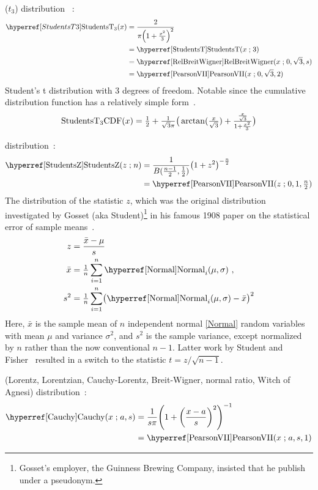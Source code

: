  ($t_3$) distribution~\cite{Devroye1986} :
\begin{align}
\label{StudentsT3}
\StudentsTTT(x)
&= \frac{2}{\pi \Left( 1 + \tfrac{x^2}{3} \Right)^{2} } \checked
\\ \notag 
& = \opr{StudentsT}(x\given 3) \checked
\\ \notag
& = \opr{RelBreitWigner}(x\given 0, \sqrt{3}, s) 
\\ \notag 
&= \opr{PearsonVII}(x\given 0,\sqrt{3},2) \checked
\end{align}
Student's t distribution with 3 degrees of freedom. Notable since the cumulative distribution function has a relatively simple form~\cite[p37]{Devroye1986}.
\[
\notag 
\op{StudentsT_3 CDF} (x) = \half + \sfrac{1}{\sqrt{3}\pi} \bigr( \arctan( \sfrac{x}{\sqrt{3}}) + \sfrac{\sfrac{x}{\sqrt{3}}}{1+\sfrac{x^2}{3}} \bigl) \checked
\]



  distribution~\cite{Student1908,Hanley2008}:
\begin{align}
\label{StudentsZ}
\opr{StudentsZ}(z\given n) &= \frac{1}{B(\tfrac{n-1}{2}, \tfrac{1}{2})}  \Left( 1 + z^2 \Right)^{-\frac{n}{2} } \checked \\
&= \opr{PearsonVII}(z\given 0,1,\tfrac{n}{2}) \notag \checked
\end{align}
The distribution of the statistic $z$, which was the original distribution investigated by Gosset (aka Student)\footnote{Gosset's employer, the Guinness Brewing Company, insisted that he publish under a pseudonym.} in his famous 1908 paper
 on the statistical error of sample means~\cite{Student1908}.
\begin{align*}
	z &= \frac {\bar{x} - \mu}{s} \\ 
	\bar{x} &= \tfrac{1}{n} \sum_{i=1}^{n} \opr{Normal}_i (\mu,\sigma) \ , \\
	s^2 &= \tfrac{1}{n} \sum_{i=1}^{n} \bigl( \opr{Normal}_i (\mu,\sigma) - \bar{x} \bigr)^2
\end{align*}
Here, $\bar{x}$ is the sample mean of $n$ independent normal \eqref{Normal} random variables with mean $\mu$ and variance  $\sigma^2$, and $s^2$ is the sample variance, except normalized by $n$ rather than the now conventional $n-1$. Latter work by Student and Fisher~\cite{Fisher1925b} resulted in a switch to the statistic $t= z/\sqrt{n-1}$.


 (Lorentz, Lorentzian, Cauchy-Lorentz,  Breit-Wigner, normal ratio, Witch of Agnesi) distribution~\cite{Poisson1827,Cauchy1853,Johnson1995}: 
%
\begin{align}
\label{Cauchy}
\opr{Cauchy}(x\given a,s) &= \frac{1}{s \pi} \Left( 1 +\Left( \frac{x-a}{s}\Right)^2 \Right)^{-1}		\checked
\\  
&= \opr{PearsonVII}(x\given a,s,1)												\checked
\notag 
\end{align}

